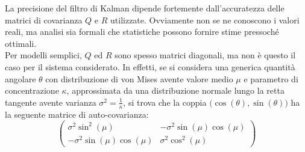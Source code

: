 \documentclass[12pt,a4paper,openright,twoside]{book}
\begin{document}
La precisione del filtro di Kalman dipende fortemente dall'accuratezza delle matrici di covarianza $Q$ e $R$ utilizzate. Ovviamente non se ne conoscono i valori reali, ma analisi sia formali che statistiche possono fornire stime pressoché ottimali. \\
Per modelli semplici, $Q$ ed $R$ sono spesso matrici diagonali, ma non è questo il caso per il sistema considerato. In effetti, se si considera una generica quantità angolare $\theta$ con distribuzione di von Mises avente valore medio $\mu$ e parametro di concentrazione $\kappa$, approssimata da una distribuzione normale lungo la retta tangente avente varianza $\sigma^2=\frac{1}{\kappa}$, si trova che la coppia $\bigl(\cos(\theta),\sin(\theta)\bigr)$ ha la seguente matrice di auto-covarianza:
\begin{equation}
\begin{pmatrix}
\sigma^2\sin^2(\mu) & -\sigma^2\sin(\mu)\cos(\mu) \\
-\sigma^2\sin(\mu)\cos(\mu) & \sigma^2\cos^2(\mu)
\end{pmatrix}
\end{equation}
\end{document}
